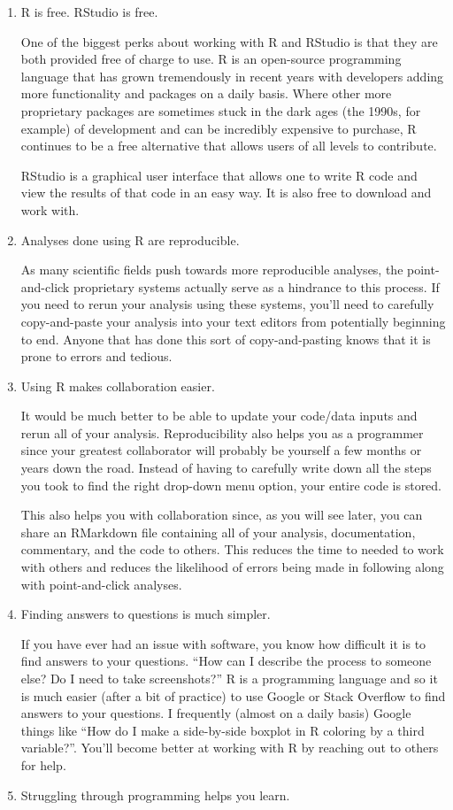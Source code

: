 \documentclass[]{tufte-book}
\begin{document}
\begin{enumerate}
\def\labelenumi{\arabic{enumi}.}
\item
  R is free. RStudio is free.

  One of the biggest perks about working with R and RStudio is that they
  are both provided free of charge to use. R is an open-source
  programming language that has grown tremendously in recent years with
  developers adding more functionality and packages on a daily basis.
  Where other more proprietary packages are sometimes stuck in the dark
  ages (the 1990s, for example) of development and can be incredibly
  expensive to purchase, R continues to be a free alternative that
  allows users of all levels to contribute.

  RStudio is a graphical user interface that allows one to write R code
  and view the results of that code in an easy way. It is also free to
  download and work with.
\item
  Analyses done using R are reproducible.

  As many scientific fields push towards more reproducible analyses, the
  point-and-click proprietary systems actually serve as a hindrance to
  this process. If you need to rerun your analysis using these systems,
  you'll need to carefully copy-and-paste your analysis into your text
  editors from potentially beginning to end. Anyone that has done this
  sort of copy-and-pasting knows that it is prone to errors and tedious.
\item
  Using R makes collaboration easier.

  It would be much better to be able to update your code/data inputs and
  rerun all of your analysis. Reproducibility also helps you as a
  programmer since your greatest collaborator will probably be yourself
  a few months or years down the road. Instead of having to carefully
  write down all the steps you took to find the right drop-down menu
  option, your entire code is stored.

  This also helps you with collaboration since, as you will see later,
  you can share an RMarkdown file containing all of your analysis,
  documentation, commentary, and the code to others. This reduces the
  time to needed to work with others and reduces the likelihood of
  errors being made in following along with point-and-click analyses.
\item
  Finding answers to questions is much simpler.

  If you have ever had an issue with software, you know how difficult it
  is to find answers to your questions. ``How can I describe the process
  to someone else? Do I need to take screenshots?'' R is a programming
  language and so it is much easier (after a bit of practice) to use
  Google or Stack Overflow to find answers to your questions. I
  frequently (almost on a daily basis) Google things like ``How do I
  make a side-by-side boxplot in R coloring by a third variable?''.
  You'll become better at working with R by reaching out to others for
  help.
\item
  Struggling through programming helps you learn.


\end{enumerate}
\end{document}
